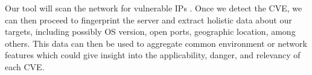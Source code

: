Our tool will scan the network for vulnerable IPs . Once we detect the CVE, we can then proceed to fingerprint the server and extract holistic data about our targets, including possibly OS version, open ports, geographic location, among others. This data can then be used to aggregate common environment or network features which could give insight into the applicability, danger, and relevancy of each CVE.